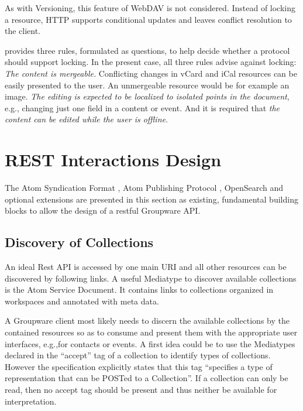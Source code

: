 \documentclass[11pt,a4paper,headsepline,twoside]{scrartcl}		%
\begin{document}
As with Versioning, this feature of WebDAV is not considered. Instead of locking
a resource, HTTP supports conditional updates and leaves conflict resolution to
the client.

\cite[sec. 1]{Nielsen1999} provides three rules, formulated as questions, to
help decide whether a protocol should support locking. In the present case,
all three rules advise against locking: \textit{The content is mergeable.}
Conflicting changes in vCard and iCal resources can be easily presented to the
user. An unmergeable resource would be for example an image. \textit{The editing
  is expected to be localized to isolated points in the document}, e.g.,
changing just one field in a content or event. And it is required that
\textit{the content can be edited while the user is offline}.

\section{REST Interactions Design}
\label{sec:interactions}

The Atom Syndication Format \cite{RFC4287}, Atom Publishing
Protocol \cite{RFC5023}, OpenSearch \cite{Clinton} and optional extensions are
presented in this section as existing, fundamental building blocks to allow the
design of a restful Groupware API.

\subsection{Discovery of Collections}
\label{sec:disc-coll}

An ideal Rest API is accessed by one main URI and all other resources can be
discovered by following links. A useful Mediatype to discover available
collections is the Atom Service Document\cite[sec. 8]{RFC5023}. It contains
links to collections organized in workspaces and annotated with meta data.

A Groupware client most likely needs to discern the available collections by the
contained resources so as to consume and present them with the appropriate user
interfaces, e.g.,for contacts or events. A first idea could be to use the
Mediatypes declared in the ``accept'' tag of a collection to identify types of
collections. However the specification explicitly states that this tag
``specifies a type of representation that can be POSTed to a
Collection''\cite[sec. 8.3.4]{RFC5023}. If a collection can only be read, then
no accept tag should be present and thus neither be available for
interpretation.
\end{document}

